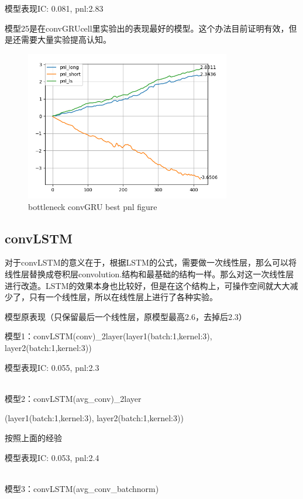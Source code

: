\documentclass[11pt]{ctexart}
\begin{document}
模型表现{\kaishu \small IC: 0.081, pnl:2.83}

模型25是在convGRUcell里实验出的表现最好的模型。这个办法目前证明有效，但是还需要大量实验提高认知。

\begin{figure}[H]

\begin{center}
\includegraphics[width=0.8\textwidth]{3.PNG}
\end{center}
\caption{bottleneck convGRU best pnl figure}
\label{FIG.2}
\end{figure}


\subsection{convLSTM}
对于convLSTM的意义在于，根据LSTM的公式，需要做一次线性层，那么可以将线性层替换成卷积层convolution.结构和最基础的结构一样。那么对这一次线性层进行改造。LSTM的效果本身也比较好，但是在这个结构上，可操作空间就大大减少了，只有一个线性层，所以在线性层上进行了各种实验。

模型原表现（只保留最后一个线性层，原模型最高2.6，去掉后2.3）

模型1：convLSTM(conv)\_2layer(layer1(batch:1,kernel:3), layer2(batch:1,kernel:3))

模型表现{\kaishu \small IC: 0.055, pnl:2.3}

~\\
模型2：convLSTM(avg\_conv)\_2layer

(layer1(batch:1,kernel:3), layer2(batch:1,kernel:3))

按照上面的经验

模型表现{\kaishu \small IC: 0.053, pnl:2.4}

~\\
模型3：convLSTM(avg\_conv\_batchnorm)
\end{document}
